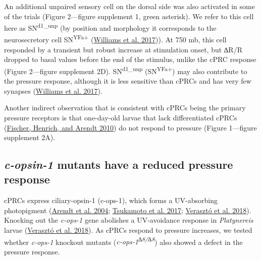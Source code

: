 \documentclass[
]{article}
\begin{document}
An additional unpaired sensory cell on the dorsal side was also
activated in some of the trials (Figure 2---figure supplement 1, green
asterisk). We refer to this cell here as SN\textsuperscript{d1\_unp} (by
position and morphology it corresponds to the neurosecretory cell
SN\textsuperscript{YFa+} (\protect\hyperlink{ref-williams2017}{Williams
et al. 2017})). At 750 mb, this cell responded by a transient but robust
increase at stimulation onset, but ∆R/R dropped to basal values before
the end of the stimulus, unlike the cPRC response (Figure 2---figure
supplement 2D). SN\textsuperscript{d1\_unp} (SN\textsuperscript{YFa+})
may also contribute to the pressure response, although it is less
sensitive than cPRCs and has very few synapses
(\protect\hyperlink{ref-williams2017}{Williams et al. 2017}).

Another indirect observation that is consistent with cPRCs being the
primary pressure receptors is that one-day-old larvae that lack
differentiated cPRCs (\protect\hyperlink{ref-fischer2010}{Fischer,
Henrich, and Arendt 2010}) do not respond to pressure (Figure 1---figure
supplement 2A).

\hypertarget{c-opsin-1-mutants-have-a-reduced-pressure-response}{%
\subsection{\texorpdfstring{\emph{c-opsin-1} mutants have a reduced
pressure
response}{c-opsin-1 mutants have a reduced pressure response}}\label{c-opsin-1-mutants-have-a-reduced-pressure-response}}

cPRCs express ciliary-opsin-1 (c-ops-1), which forms a UV-absorbing
photopigment (\protect\hyperlink{ref-arendt2004}{Arendt et al. 2004};
\protect\hyperlink{ref-Tsukamoto2017}{Tsukamoto et al. 2017};
\protect\hyperlink{ref-veraszto2018}{Verasztó et al. 2018}). Knocking
out the \emph{c-ops-1} gene abolishes a UV-avoidance response in
\emph{Platynereis} larvae (\protect\hyperlink{ref-veraszto2018}{Verasztó
et al. 2018}). As cPRCs respond to pressure increases, we tested whether
\emph{c-ops-1} knockout mutants (\emph{c-ops-1\textsuperscript{∆8/∆8}})
also showed a defect in the pressure response.
\end{document}
